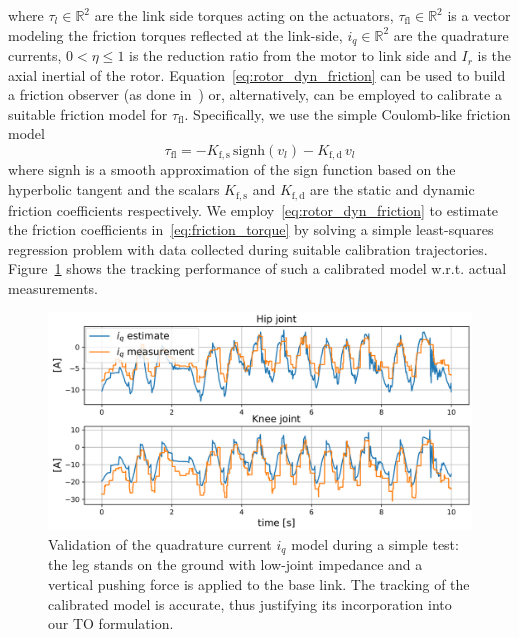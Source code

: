 where $\tau_l\in\mathbb{R}^{2}$ are the link side torques acting on the actuators, $\tau_{\mathrm{fl}}\in\mathbb{R}^{2}$ is a vector modeling the friction torques reflected at the link-side, $i_q\in\mathbb{R}^{2}$ are the quadrature currents, $0 < \eta \leq 1$ is the reduction ratio from the motor to link side and $I_r$ is the axial inertial of the rotor. Equation~\eqref{eq:rotor_dyn_friction} can be used to build a friction observer (as done in~\cite{friction_comp::le2008friction}) or, alternatively, can be employed to calibrate a suitable friction model for $\tau_{\mathrm{fl}}$.
Specifically, we use the simple Coulomb-like friction model 
\begin{equation} \label{eq:friction_torque}
\tau_{\mathrm{fl}} = - K_{\mathrm{f, s}}\,\mathrm{signh}({v_l}) - K_{\mathrm{f, d}}\,v_l
\end{equation}
where $\mathrm{signh}$ is a smooth approximation of the sign function based on the hyperbolic tangent and the scalars $K_{\mathrm{f, s}}$ and $K_{\mathrm{f, d}}$ are the static and dynamic friction coefficients respectively. We employ~\eqref{eq:rotor_dyn_friction} to estimate the friction coefficients in~\eqref{eq:friction_torque} by solving a simple least-squares regression problem with data collected during suitable calibration trajectories. Figure~\ref{fig:iq_model_tracking} shows the tracking performance of such a calibrated model w.r.t. actual measurements.
\begin{figure}
    \centering
    \includegraphics[width=1.0\columnwidth]{images/iq_tracking.pdf}
    \caption{Validation of the quadrature current $i_q$ model during a simple test: the leg stands on the ground with low-joint impedance and a vertical pushing force is applied to the base link. The tracking of the calibrated model is accurate, thus justifying its incorporation into our TO formulation.}
    \label{fig:iq_model_tracking}
\end{figure}
